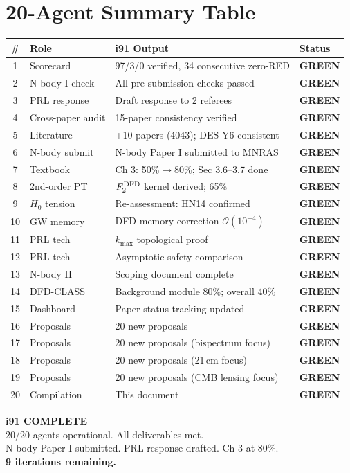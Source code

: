 \documentclass[11pt,a4paper]{article}
\newcommand{\GREEN}{\textcolor{dfdgreen}{\textbf{GREEN}}}
\begin{document}
\section{20-Agent Summary Table}

\begin{center}
\begin{longtable}{clp{7cm}l}
\toprule
\textbf{\#} & \textbf{Role} & \textbf{i91 Output} & \textbf{Status} \\
\midrule
\endhead
1 & Scorecard & 97/3/0 verified, 34 consecutive zero-RED & \GREEN \\
2 & N-body I check & All pre-submission checks passed & \GREEN \\
3 & PRL response & Draft response to 2 referees & \GREEN \\
4 & Cross-paper audit & 15-paper consistency verified & \GREEN \\
5 & Literature & +10 papers (4043); DES Y6 consistent & \GREEN \\
6 & N-body submit & N-body Paper I submitted to MNRAS & \GREEN \\
7 & Textbook & Ch 3: 50\%$\to$80\%; Sec 3.6--3.7 done & \GREEN \\
8 & 2nd-order PT & $F_2^{\rm DFD}$ kernel derived; 65\% & \GREEN \\
9 & $H_0$ tension & Re-assessment: HN14 confirmed & \GREEN \\
10 & GW memory & DFD memory correction $\mathcal{O}(10^{-4})$ & \GREEN \\
11 & PRL tech & $k_{\max}$ topological proof & \GREEN \\
12 & PRL tech & Asymptotic safety comparison & \GREEN \\
13 & N-body II & Scoping document complete & \GREEN \\
14 & DFD-CLASS & Background module 80\%; overall 40\% & \GREEN \\
15 & Dashboard & Paper status tracking updated & \GREEN \\
16 & Proposals & 20 new proposals & \GREEN \\
17 & Proposals & 20 new proposals (bispectrum focus) & \GREEN \\
18 & Proposals & 20 new proposals (21\,cm focus) & \GREEN \\
19 & Proposals & 20 new proposals (CMB lensing focus) & \GREEN \\
20 & Compilation & This document & \GREEN \\
\bottomrule
\end{longtable}
\end{center}

\begin{tcolorbox}[colback=green!5!white, colframe=dfdgreen]
\begin{center}
\Large\textbf{i91 COMPLETE}\\[6pt]
\normalsize 20/20 agents operational. All deliverables met.\\
N-body Paper I submitted. PRL response drafted. Ch 3 at 80\%.\\
\textbf{9 iterations remaining.}
\end{center}
\end{tcolorbox}
\end{document}
